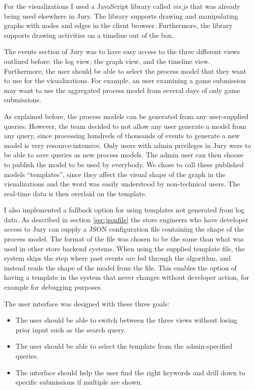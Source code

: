 For the visualizations I used a JavaScript library called \emph{vis.js} \cite{visjs} that was already being used elsewhere in Jury.
The library supports drawing and manipulating graphs with nodes and edges in the client browser.
Furthermore, the library supports drawing activities on a timeline out of the box.

The events section of Jury was to have easy access to the three different views outlined before: the log view, the graph view, and the timeline view. Furthermore, the user should be able to select the process model that they want to use for the visualizations.
For example, an user examining a game submission may want to use the aggregated process model from several days of only game submissions.

As explained before, the process models can be generated from any user-supplied queries.
However, the team decided to not allow any user generate a model from any query, since processing hundreds of thousands of events to generate a new model is very resource-intensive.
Only users with admin privileges in Jury were to be able to save queries as new process models.
The admin user can then choose to publish the model to be used by everybody.
We chose to call these published models ``templates'', since they affect the visual shape of the graph in the visualizations and the word was easily understood by non-technical users.
The real-time data is then overlaid on the template.

I also implemented a fallback option for using templates not generated from log data. As described in section \ref{sec:jsonfile} the store engineers who have developer access to Jury can supply a JSON configuration file containing the shape of the process model. The format of the file was chosen to be the same than what was used in other store backend systems. 
When using the supplied template file, the system skips the step where past events are fed through the algorithm, and instead reads the shape of the model from the file.  
This enables the option of having a template in the system that never changes without developer action, for example for debugging purposes.

The user interface was designed with these three goals:
\begin{itemize}
    \item The user should be able to switch between the three views without losing prior input such as the search query.
    \item The user should be able to select the template from the admin-specified queries.
    \item The interface should help the user find the right keywords and drill down to specific submissions if multiple are shown.
\end{itemize}

